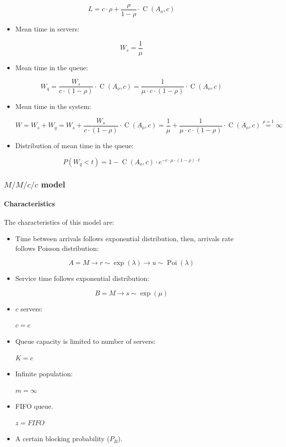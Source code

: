 \documentclass[../main.tex]{subfiles}
\begin{document}
\begin{itemize}
{		$$
			L = c \cdot \rho + \frac {\rho} {1-\rho} \cdot \operatorname{C}(A_o, c)
		$$
	}
	\item {
		Mean time in servers:

		$$
			W_s = \frac {1} {\mu}
		$$
	}
	\item {
		Mean time in the queue:

		$$
			W_q =
			\frac {W_s} {c \cdot (1-\rho)} \cdot \operatorname{C}(A_o, c) =
			\frac {1} {\mu \cdot c \cdot (1-\rho)} \cdot \operatorname{C}(A_o, c)
		$$
	}
	\item {
		Mean time in the system:

		$$
			W =
			W_s + W_q =
			W_s + \frac {W_s} {c \cdot (1-\rho)} \cdot \operatorname{C}(A_o, c) =
			\frac {1} {\mu} + \frac {1} {\mu \cdot c \cdot (1-\rho)} \cdot \operatorname{C}(A_o, c)
			\overset {\rho=1} {=} \infty
		$$
	}
	\item {
		Distribution of mean time in the queue:

		$$
			P(W_q < t) = 1 - \operatorname{C}(A_o, c) \cdot e^{- c \cdot \mu \cdot (1-\rho) \cdot t}
		$$
	}
\end{itemize}

\subsubsection{$M/M/c/c$ model}

\paragraph{Characteristics}

The characteristics of this model are:

\begin{itemize}
	\item {
		Time between arrivals follows exponential distribution, then, arrivals rate follows Poisson distribution:

		$$
			A = M \rightarrow r \sim \operatorname{exp} (\lambda) \rightarrow u \sim \operatorname{Poi} (\lambda)
		$$
	}
	\item {
		Service time follows exponential distribution:

		$$
			B = M \rightarrow s \sim \operatorname{exp} (\mu)
		$$
	}
	\item {
		$c$ servers:

		$
			c = c
		$
	}
	\item {
		Queue capacity is limited to number of servers:

		$
			K = c
		$
	}
	\item {
		Infinite population:

		$
			m = \infty
		$
	}
	\item {
		FIFO queue.

		$
			z = FIFO
		$
	}
	\item A certain blocking probability ($P_B$).
\end{itemize}
\end{document}
